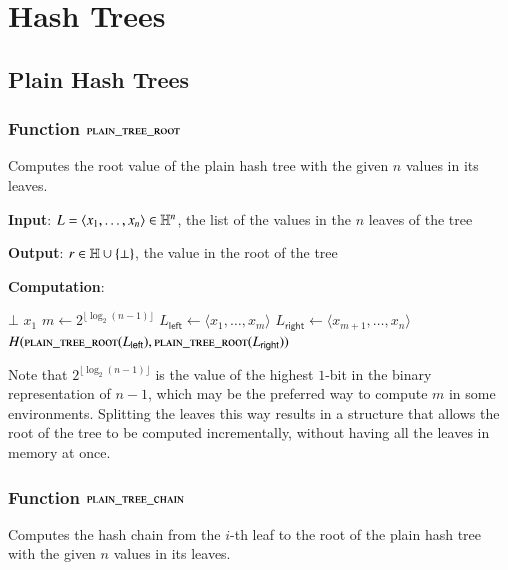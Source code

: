 \chapter{Hash Trees}\label{app:hashtrees}

\section{Plain Hash Trees}

\subsection{Function $\textsc{plain\_tree\_root}$}\label{sec:plain-tree-root}

Computes the root value of the plain hash tree with the given $n$ values in its leaves.

\textbf{Input}:
$L = \langle x_1, \ldots, x_n \rangle \in \mathbb{H}^n$, the list of the values in the $n$ leaves of the tree

\textbf{Output}:
$r \in \mathbb{H}\cup\{\bot\}$, the value in the root of the tree

\textbf{Computation}:
\begin{algorithmic}
		 
			\State \Return $\bot$
		 
			\State \Return $x_1$
		\Else
			\State $m \gets 2^{\lfloor \log_2(n-1) \rfloor}$ 
			\State $L_\mathsf{left} \gets \langle x_1, \ldots, x_m \rangle$
			\State $L_\mathsf{right} \gets \langle x_{m+1}, \ldots, x_n \rangle$
			\State \Return $H(\Call{plain\_tree\_root}{L_\mathsf{left}} , \Call{plain\_tree\_root}{L_\mathsf{right}})$
		\EndIf
	\EndFunction
\end{algorithmic}

Note that $2^{\lfloor \log_2(n-1) \rfloor}$ is the value of the highest $1$-bit in the binary representation of $n - 1$, which may be the preferred way to compute $m$ in some environments. Splitting the leaves this way results in a structure that allows the root of the tree to be computed incrementally, without having all the leaves in memory at once.

\subsection{Function $\textsc{plain\_tree\_chain}$}\label{sec:plain-tree-chain}

Computes the hash chain from the $i$-th leaf to the root of the plain hash tree with the given $n$ values in its leaves.

